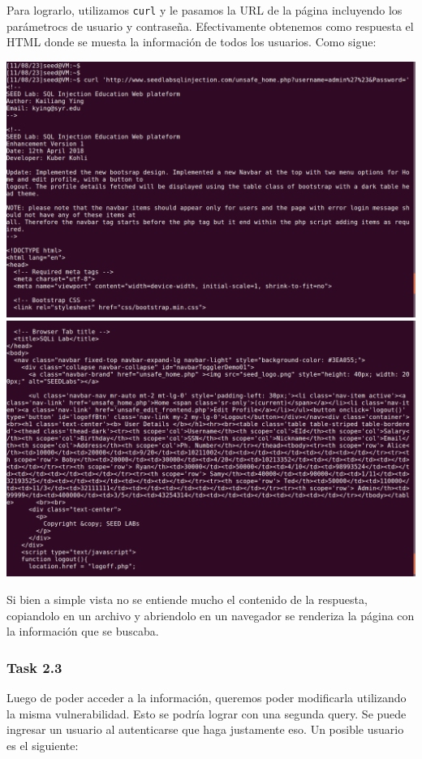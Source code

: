 \documentclass[11pt]{article}
\begin{document}
Para lograrlo, utilizamos \verb|curl| y le pasamos la URL de la página incluyendo los parámetrocs de usuario 
y contraseña. Efectivamente obtenemos como respuesta el HTML donde se muesta la información de todos los usuarios.
Como sigue:
\begin{center}
    \includegraphics[scale=.34]{task2_2_1_sql.png}
    \includegraphics[scale=.34]{task2_2_2_sql.png}
\end{center}

Si bien a simple vista no se entiende mucho el contenido de la respuesta, copiandolo en un archivo y abriendolo en 
un navegador se renderiza la página con la información que se buscaba.

\subsubsection*{Task 2.3}
Luego de poder acceder a la información, queremos poder modificarla utilizando la misma vulnerabilidad. Esto se 
podría lograr con una segunda query. Se puede ingresar un usuario al autenticarse que haga justamente eso.
Un posible usuario es el siguiente: 
\end{document}
